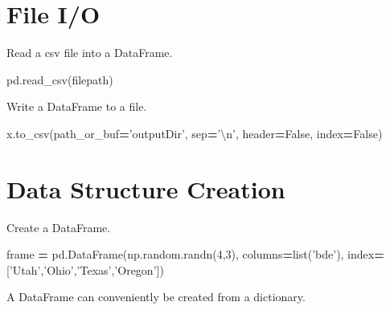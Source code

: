 \documentclass[]{book}
\newenvironment{Shaded}{\begin{snugshade}}{\end{snugshade}}
\newcommand{\BuiltInTok}[1]{#1}
\newcommand{\CharTok}[1]{\textcolor[rgb]{0.31,0.60,0.02}{#1}}
\newcommand{\DecValTok}[1]{\textcolor[rgb]{0.00,0.00,0.81}{#1}}
\newcommand{\NormalTok}[1]{#1}
\newcommand{\OperatorTok}[1]{\textcolor[rgb]{0.81,0.36,0.00}{\textbf{#1}}}
\newcommand{\StringTok}[1]{\textcolor[rgb]{0.31,0.60,0.02}{#1}}
\newcommand{\VariableTok}[1]{\textcolor[rgb]{0.00,0.00,0.00}{#1}}
\begin{document}
\hypertarget{file-io}{%
\section{File I/O}\label{file-io}}

Read a csv file into a DataFrame.

\begin{Shaded}
\begin{Highlighting}[]
\NormalTok{pd.read_csv(filepath)}
\end{Highlighting}
\end{Shaded}

Write a DataFrame to a file.

\begin{Shaded}
\begin{Highlighting}[]
\NormalTok{x.to_csv(path_or_buf}\OperatorTok{=}\StringTok{'outputDir'}\NormalTok{, sep}\OperatorTok{=}\StringTok{'}\CharTok{\textbackslash{}n}\StringTok{'}\NormalTok{, header}\OperatorTok{=}\VariableTok{False}\NormalTok{, index}\OperatorTok{=}\VariableTok{False}\NormalTok{)}
\end{Highlighting}
\end{Shaded}

\hypertarget{data-structure-creation}{%
\section{Data Structure Creation}\label{data-structure-creation}}

Create a DataFrame.

\begin{Shaded}
\begin{Highlighting}[]
\NormalTok{frame }\OperatorTok{=}\NormalTok{ pd.DataFrame(np.random.randn(}\DecValTok{4}\NormalTok{,}\DecValTok{3}\NormalTok{), columns}\OperatorTok{=}\BuiltInTok{list}\NormalTok{(}\StringTok{'bde'}\NormalTok{), index}\OperatorTok{=}\NormalTok{[}\StringTok{'Utah'}\NormalTok{,}\StringTok{'Ohio'}\NormalTok{,}\StringTok{'Texas'}\NormalTok{,}\StringTok{'Oregon'}\NormalTok{])}
\end{Highlighting}
\end{Shaded}

A DataFrame can conveniently be created from a dictionary.
\end{document}
